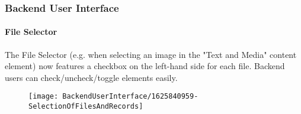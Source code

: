 %

\begin{frame}[fragile]
	\frametitle{Backend User Interface}
	\framesubtitle{File Selector}

	The File Selector (e.g. when selecting an image in the "Text and Media" content
	element) now features a checkbox on the left-hand side for each file. Backend
	users can check/uncheck/toggle elements easily.

	\begin{figure}
		\texttt{[image: BackendUserInterface/1625840959-SelectionOfFilesAndRecords]}
	\end{figure}

\end{frame}


